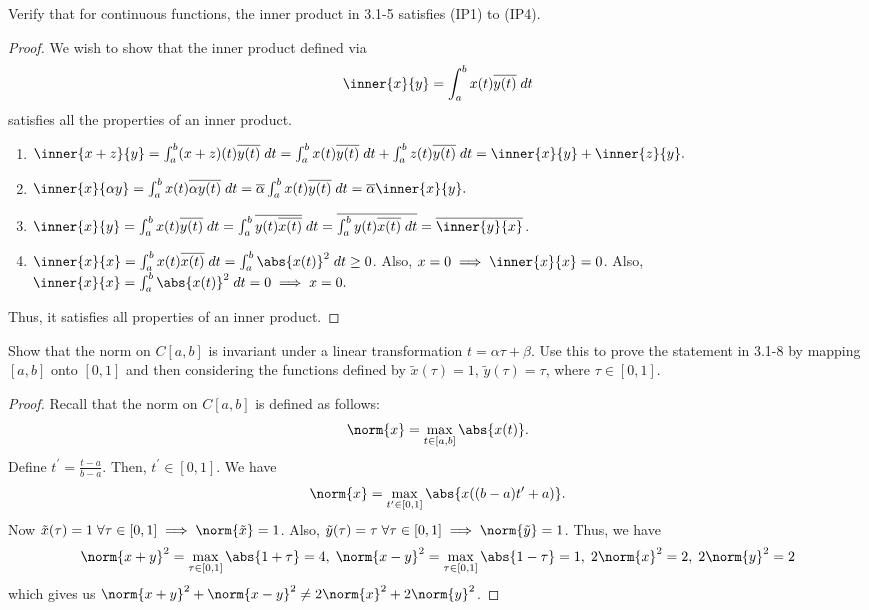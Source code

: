 \begin{question}
    Verify that for continuous functions, the inner product in 3.1-5 satisfies (IP1) to (IP4).
    \label{section3.1-13}
\end{question}
\begin{proof}
    We wish to show that the inner product defined via
    \[\inner{x}{y} = \int_{a}^{b} x(t) \overline{y(t)} \;dt\]
    satisfies all the properties of an inner product. 
    \begin{enumerate}
        \item $\inner{x+z}{y} = \int_{a}^{b} (x+z)(t) \overline{y(t)} \;dt = \int_{a}^b x(t) \overline{y(t)}\;dt +  \int_{a}^b z(t) \overline{y(t)}\;dt = \inner{x}{y} + \inner{z}{y}.$
        \item $\inner{x}{\alpha y} = \int_{a}^{b} x(t) \overline{\alpha y(t)} \; dt = \overline{\alpha} \int_{a}^{b} x(t) \overline{y(t)} \;dt = \overline{\alpha} \inner{x}{y}.$
        \item $\inner{x}{y} = \int_{a}^{b} x(t) \overline{y(t)} \; dt = \int_{a}^{b} \overline{y(t) \overline{x(t)}} \; dt = \overline{\int_{a}^b y(t) \overline{x(t)} \; dt} = \overline{\inner{y}{x}}$.
        \item $\inner{x}{x} = \int_{a}^b x(t) \overline{x(t)} \; dt = \int_{a}^{b} \abs{x(t)}^2 \;dt \geq 0$. Also, $x = 0 \implies \inner{x}{x} = 0$. Also, $\inner{x}{x} = \int_{a}^{b} \abs{x(t)}^2 \;dt = 0 \implies x = 0.$
    \end{enumerate}
    Thus, it satisfies all properties of an inner product.
\end{proof}

\begin{question}
    Show that the norm on $C[a,b]$ is invariant under a linear transformation $t = \alpha \tau + \beta$. Use this to prove the statement in 3.1-8 by mapping $[a,b]$ onto $[0,1]$ and then considering the functions defined by $\tilde{x}(\tau) = 1$, $\tilde{y}(\tau) = \tau$, where $\tau \in [0,1]$.
    \label{section3.1-14}
\end{question}
\begin{proof}
    Recall that the norm on $C[a,b]$ is defined as follows:
    \[\norm{x} = \max_{t \in [a,b]} \abs{x(t)}.\]
    Define $t^\prime = \frac{t-a}{b-a}$. Then, $t^\prime \in [0,1]$. We have
    \[\norm{x} = \max_{t^\prime \in [0,1]} \abs{x((b-a)t^\prime + a)}.\]
    Now $\tilde{x}(\tau) = 1 \;\forall \tau \in [0,1] \implies \norm{\tilde{x}} = 1$. Also, $\tilde{y}(\tau) = \tau \;\forall \tau \in [0,1] \implies \norm{\tilde{y}} = 1$. Thus, we have
    \[\norm{x + y}^2 = \max_{\tau \in [0,1]} \abs{1 + \tau} = 4 , \;\norm{x-y}^2 = \max_{\tau \in [0,1]} \abs{1-\tau} = 1, \;2\norm{x}^2 = 2 , \;2\norm{y}^2 = 2\] which gives us $ \norm{x+y}^2 + \norm{x-y}^2 \neq 2\norm{x}^2 + 2\norm{y}^2$.
\end{proof}

